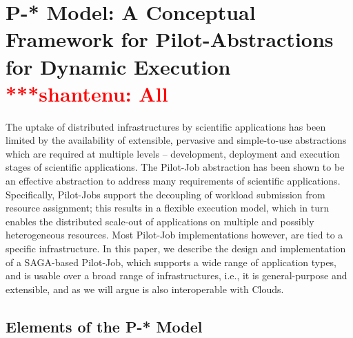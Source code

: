 \documentclass[conference,final]{IEEEtran}
\newcommand{\jhanote}[1]{ {\textcolor{red} { ***shantenu: #1 }}}
\newcommand{\jhanote}[1]{}
\begin{document}
\section{P-* Model: A Conceptual Framework for Pilot-Abstractions for
  Dynamic Execution \jhanote{All}}
\label{sec:pilot-model}


The uptake of distributed infrastructures by scientific applications
has been limited by the availability of extensible, pervasive and
simple-to-use abstractions which are required at multiple levels –
development, deployment and execution stages of scientific
applications. The Pilot-Job abstraction has been shown to be an
effective abstraction to address many requirements of scientific
applications. Specifically, Pilot-Jobs support the decoupling of
workload submission from resource assignment; this results in a
flexible execution model, which in turn enables the distributed
scale-out of applications on multiple and possibly heterogeneous
resources. Most Pilot-Job implementations however, are tied to a
specific infrastructure. In this paper, we describe the design and
implementation of a SAGA-based Pilot-Job, which supports a wide range
of application types, and is usable over a broad range of
infrastructures, i.e., it is general-purpose and extensible, and as we
will argue is also interoperable with Clouds.

\subsection{Elements of the P-* Model}
\end{document}
